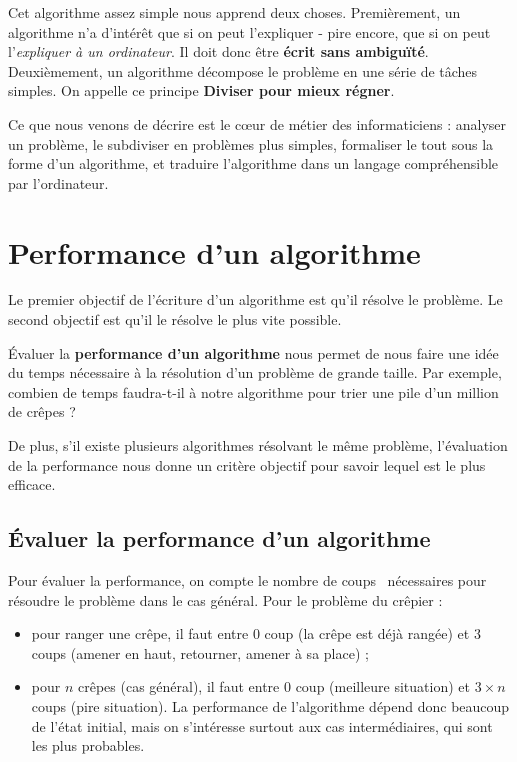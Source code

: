 \documentclass[a5paper,pagesize,DIV=14]{scrbook}
\begin{document}
Cet algorithme assez simple nous apprend deux choses. Premièrement, un
algorithme n'a d'intérêt que si on peut l'expliquer - pire encore, que si on
peut l'\textit{expliquer à un ordinateur}. Il doit donc être \textbf{écrit sans
ambiguïté}. Deuxièmement, un algorithme décompose le problème en une série de tâches simples. On appelle ce principe \textbf{\og Diviser pour mieux régner\fg}.

Ce que nous venons de décrire est le c\oe{}ur de métier des informaticiens : analyser un problème, le subdiviser en problèmes plus simples, formaliser le tout sous la forme d'un algorithme, et traduire l'algorithme dans un langage compréhensible par l'ordinateur.

\section*{Performance d'un algorithme}

Le premier objectif de l'écriture d'un algorithme est qu'il résolve le problème. Le second objectif est qu'il le résolve le plus vite possible. 

Évaluer la \textbf{performance d'un algorithme} nous permet de nous faire une idée du temps nécessaire à la résolution d'un problème de grande taille. Par exemple, combien de temps faudra-t-il à notre algorithme pour trier une pile d'un million de crêpes ?

De plus, s'il existe plusieurs algorithmes résolvant le même problème, l'évaluation de la performance nous donne un critère objectif pour savoir lequel est le plus efficace.

\subsection*{Évaluer la performance d'un algorithme}

Pour évaluer la performance, on compte le nombre de \og coups \fg\ nécessaires pour résoudre le problème dans le cas général. Pour le problème du crêpier :

\begin{itemize}
  \item pour ranger une crêpe, il faut entre $0$ coup (la crêpe est déjà rangée) et $3$ coups (amener en haut, retourner, amener à sa place) ;
  \item pour $n$ crêpes (cas général), il faut entre $0$ coup (meilleure situation) et $3 \times n$ coups (pire situation). La performance de l'algorithme dépend donc beaucoup de l'état initial, mais on s'intéresse surtout aux cas intermédiaires, qui sont les plus probables.
\end{itemize}
\end{document}
